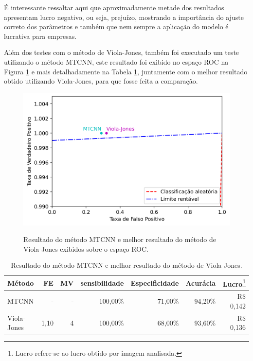 É interessante ressaltar aqui que aproximadamente metade dos resultados apresentam lucro negativo, ou seja, prejuízo, mostrando a importância do ajuste correto dos parâmetros e também que nem sempre a aplicação do modelo é lucrativa para empresas.

Além dos testes com o método de Viola-Jones, também foi executado um teste utilizando o método MTCNN, este resultado foi exibido no espaço ROC na Figura \ref{fig:results_roc_mtcnn} e mais detalhadamente na Tabela \ref{tab:results_mtcnn}, juntamente com o melhor resultado obtido utilizando Viola-Jones, para que fosse feita a comparação.

\begin{figure}[htb]
    \centering
    \caption{Resultado do método MTCNN e melhor resultado do método de Viola-Jones exibidos sobre o espaço ROC.}
    \includegraphics[scale=1]{figs/curva_roc_results_mtcnn.png}
    \label{fig:results_roc_mtcnn}
\end{figure}

\begin{table}[htbp]
    \caption{Resultado do método MTCNN e melhor resultado do método de Viola-Jones.}
    \label{tab:results_mtcnn}
    \centering
    \renewcommand{\arraystretch}{1.4}
    \begin{tabular}{lrrrrrr}
        \hline\hline
        Método      & FE   & MV & sensibilidade & Especificidade & Acurácia & Lucro\footnote{Lucro refere-se ao lucro obtido por imagem analisada.} \\
        \midrule
        MTCNN       & -    & -  & 100,00\%      & 71,00\%        & 94,20\%  & R\$ 0,142                                                             \\
        Viola-Jones & 1,10 & 4  & 100,00\%      & 68,00\%        & 93,60\%  & R\$ 0,136                                                             \\
        \hline\hline
    \end{tabular}
\end{table}

